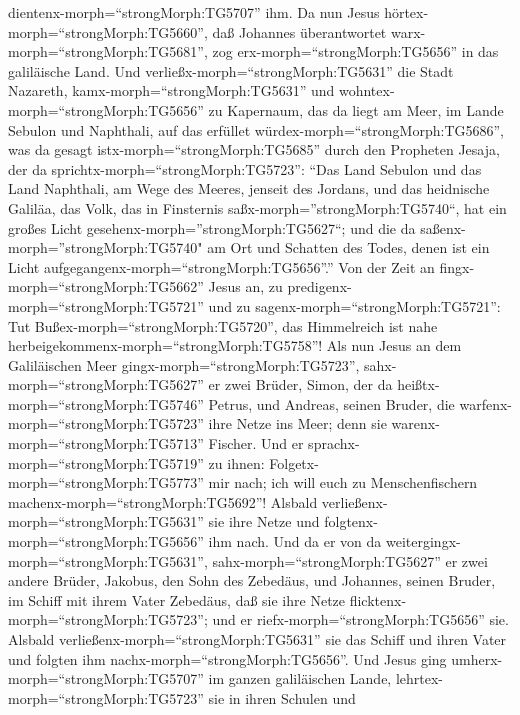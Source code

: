 dientenx-morph=``strongMorph:TG5707'' ihm.  Da nun Jesus
hörtex-morph=``strongMorph:TG5660'', daß Johannes überantwortet
warx-morph=``strongMorph:TG5681'', zog erx-morph=``strongMorph:TG5656''
in das galiläische Land.  Und
verließx-morph=``strongMorph:TG5631'' die Stadt Nazareth,
kamx-morph=``strongMorph:TG5631'' und
wohntex-morph=``strongMorph:TG5656'' zu Kapernaum, das da liegt am Meer,
im Lande Sebulon und Naphthali,  auf das erfüllet
würdex-morph=``strongMorph:TG5686'', was da gesagt
istx-morph=``strongMorph:TG5685'' durch den Propheten Jesaja, der da
sprichtx-morph=``strongMorph:TG5723'':  ``Das Land Sebulon
und das Land Naphthali, am Wege des Meeres, jenseit des Jordans, und das
heidnische Galiläa,  das Volk, das in Finsternis
saßx-morph=''strongMorph:TG5740``, hat ein großes Licht
gesehenx-morph=''strongMorph:TG5627``; und die da
saßenx-morph=''strongMorph:TG5740" am Ort und Schatten des Todes, denen
ist ein Licht aufgegangenx-morph=``strongMorph:TG5656''.'' 
Von der Zeit an fingx-morph=``strongMorph:TG5662'' Jesus an, zu
predigenx-morph=``strongMorph:TG5721'' und zu
sagenx-morph=``strongMorph:TG5721'': Tut
Bußex-morph=``strongMorph:TG5720'', das Himmelreich ist nahe
herbeigekommenx-morph=``strongMorph:TG5758''!  Als nun
Jesus an dem Galiläischen Meer gingx-morph=``strongMorph:TG5723'',
sahx-morph=``strongMorph:TG5627'' er zwei Brüder, Simon, der da
heißtx-morph=``strongMorph:TG5746'' Petrus, und Andreas, seinen Bruder,
die warfenx-morph=``strongMorph:TG5723'' ihre Netze ins Meer; denn sie
warenx-morph=``strongMorph:TG5713'' Fischer.  Und er
sprachx-morph=``strongMorph:TG5719'' zu ihnen:
Folgetx-morph=``strongMorph:TG5773'' mir nach; ich will euch zu
Menschenfischern machenx-morph=``strongMorph:TG5692''! 
Alsbald verließenx-morph=``strongMorph:TG5631'' sie ihre Netze und
folgtenx-morph=``strongMorph:TG5656'' ihm nach.  Und da er
von da weitergingx-morph=``strongMorph:TG5631'',
sahx-morph=``strongMorph:TG5627'' er zwei andere Brüder, Jakobus, den
Sohn des Zebedäus, und Johannes, seinen Bruder, im Schiff mit ihrem
Vater Zebedäus, daß sie ihre Netze
flicktenx-morph=``strongMorph:TG5723''; und er
riefx-morph=``strongMorph:TG5656'' sie.  Alsbald
verließenx-morph=``strongMorph:TG5631'' sie das Schiff und ihren Vater
und folgten ihm nachx-morph=``strongMorph:TG5656''.  Und
Jesus ging umherx-morph=``strongMorph:TG5707'' im ganzen galiläischen
Lande, lehrtex-morph=``strongMorph:TG5723'' sie in ihren Schulen und
